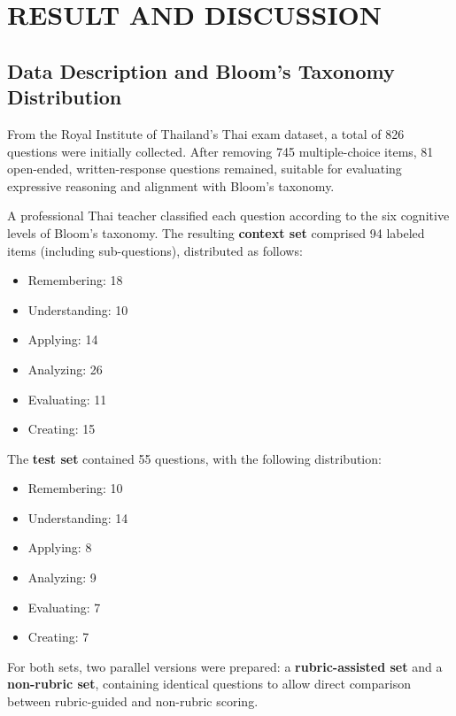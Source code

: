 \chapter{RESULT AND DISCUSSION}
\label{ch:chapter_4}

\section{Data Description and Bloom’s Taxonomy Distribution}

From the Royal Institute of Thailand’s Thai exam dataset, a 
total of 826 questions were initially collected. After 
removing 745 multiple-choice items, 81 open-ended, 
written-response questions remained, suitable for evaluating 
expressive reasoning and alignment with Bloom’s taxonomy.

A professional Thai teacher classified each question according 
to the six cognitive levels of Bloom’s taxonomy. The resulting 
\textbf{context set} comprised 94 labeled items (including 
sub-questions), distributed as follows:

\begin{itemize}
    \item Remembering: 18
    \item Understanding: 10
    \item Applying: 14
    \item Analyzing: 26
    \item Evaluating: 11
    \item Creating: 15
\end{itemize}

The \textbf{test set} contained 55 questions, with the following distribution:

\begin{itemize}
    \item Remembering: 10
    \item Understanding: 14
    \item Applying: 8
    \item Analyzing: 9
    \item Evaluating: 7
    \item Creating: 7
\end{itemize}

For both sets, two parallel versions were prepared: a 
\textbf{rubric-assisted set} and a \textbf{non-rubric set}, 
containing identical questions to allow direct comparison 
between rubric-guided and non-rubric scoring.

